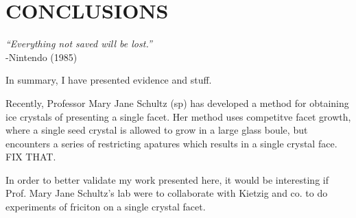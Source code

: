 \chapter{CONCLUSIONS}\label{chap:Concl}

\begin{flushright}
\textit{``Everything not saved will be lost.''} \\
-Nintendo (1985) \\
\end{flushright}

In summary, I have presented evidence and stuff.

Recently, Professor Mary Jane Schultz (sp) has developed a method for
obtaining ice crystals of presenting a single facet. Her method uses
competitve facet growth, where a single seed crystal is allowed to
grow in a large glass boule, but encounters a series of restricting
apatures which results in a single crystal face. FIX THAT.

In order to better validate my work presented here, it would be
interesting if Prof. Mary Jane Schultz's lab were to collaborate with
Kietzig and co. to do experiments of friciton on a single crystal
facet.  

